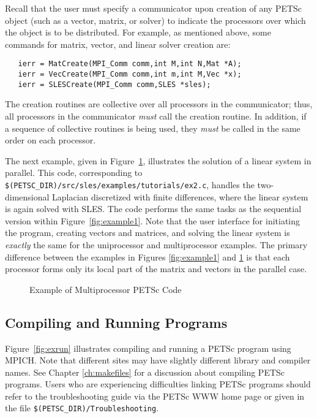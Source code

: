 Recall that the user must specify a communicator upon creation of any
PETSc object (such as a vector, matrix, or solver) to indicate the
processors over which the object is to be distributed.  For example,
as mentioned above, some commands for matrix, vector, and linear solver
creation are:
\begin{verbatim}
   ierr = MatCreate(MPI_Comm comm,int M,int N,Mat *A);
   ierr = VecCreate(MPI_Comm comm,int m,int M,Vec *x);
   ierr = SLESCreate(MPI_Comm comm,SLES *sles); 
\end{verbatim}
The creation routines are collective over all processors in the
communicator; thus, all processors in the communicator {\em must}
call the creation routine.  In addition, if a sequence of
collective routines is being used, they {\em must} be called
in the same order on each processor.

The next example, given in Figure~\ref{fig:example2}, illustrates the
solution of a linear system in parallel.  This code, corresponding to
{\tt \$(PETSC\_DIR)/src/sles/examples/tutorials/ex2.c}, handles the
two-dimensional Laplacian discretized with finite differences, where
the linear system is again solved with SLES.  The code performs the
same tasks as the sequential version within Figure~\ref{fig:example1}.
Note that the user interface for initiating the program, creating
vectors and matrices, and solving the linear system is {\em exactly}
the same for the uniprocessor and multiprocessor examples.  The
primary difference between the examples in Figures \ref{fig:example1}
and \ref{fig:example2} is that each processor forms only its local
part of the matrix and vectors in the parallel case.

\begin{figure}[H]
{\footnotesize
{}
}
\nobreak
\caption{Example of Multiprocessor PETSc Code}
\label{fig:example2}
\end{figure}

\subsection*{Compiling and Running Programs}

Figure~\ref{fig:exrun} illustrates compiling and running a PETSc program
using MPICH.  Note that different sites may have slightly different
library and compiler names.  See Chapter \ref{ch:makefiles}
for a discussion about compiling PETSc programs.
Users who are experiencing difficulties linking PETSc programs should 
refer to the troubleshooting guide via the PETSc WWW home page or
given in the file {\tt \$(PETSC\_DIR)/Troubleshooting}.

